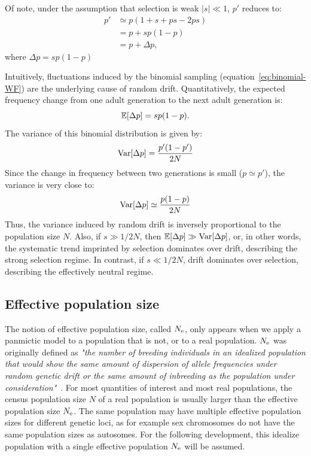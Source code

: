 Of note, under the assumption that selection is weak $|s| \ll 1$, $p'$ reduces to:
\begin{align}
    p' & \simeq p (1 + s + ps - 2ps) \\
    & = p + sp(1-p) \\
    & = p + \Delta p,
\end{align}
where $\Delta p = sp(1-p)$

Intuitively, fluctuations induced by the binomial sampling (equation~\ref{eq:binomial-WF}) are the underlying cause of random drift.
Quantitatively, the expected frequency change from one adult generation to the next adult generation is:
\begin{equation}
    \operatorname{\mathbb{E}}[\Delta p] = s p (1-p).
\end{equation}
The variance of this binomial distribution is given by:
\begin{equation}
    \operatorname{\text{Var}}[\Delta p] = \frac{p' (1-p')}{2N}
\end{equation}
Since the change in frequency between two generations is small ($p \simeq p'$), the variance is very close to:
\begin{equation}
    \operatorname{\text{Var}}[\Delta p] \simeq \frac{p (1-p)}{2N}
\end{equation}
Thus, the variance induced by random drift is inversely proportional to the population size $N$.
Also, if $s \gg 1/2N$, then $\operatorname{\mathbb{E}}[\Delta p] \gg \operatorname{\text{Var}}[\Delta p]$, or, in other words, the systematic trend imprinted by selection dominates over drift, describing the strong selection regime.
In contrast, if $s \ll 1 / 2N$, drift dominates over selection, describing the effectively neutral regime.

\subsection{Effective population size}

The notion of effective population size, called $N_{\text{e}}$, only appears when we apply a panmictic model to a population that is not, or to a real population.
$N_{\text{e}}$ was originally defined as \textit{"the number of breeding individuals in an idealized population that would show the same amount of dispersion of allele frequencies under random genetic drift or the same amount of inbreeding as the population under consideration"}~\citep{wright_evolution_1931}.
For most quantities of interest and most real populations, the census population size $N$ of a real population is usually larger than the effective population size $N_{\text{e}}$.
The same population may have multiple effective population sizes for different genetic loci, as for example sex chromosomes do not have the same population sizes as autosomes.
For the following development, this idealize population with a single effective population $N_{\text{e}}$ will be assumed.


